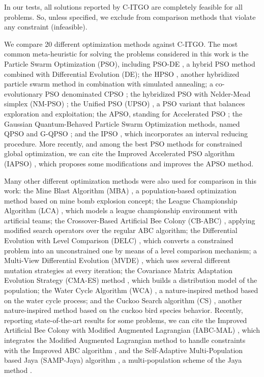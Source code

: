 


In our tests, all solutions reported by C-ITGO are completely feasible for all problems. So, unless specified, we exclude from comparison methods that violate any constraint (infeasible).

We compare 20 different optimization methods against C-ITGO. The most common meta-heuristic for solving the problems considered in this work is the Particle Swarm Optimization (PSO), including PSO-DE \citep{PSO-DE}, a hybrid PSO method combined with Differential Evolution (DE); the HPSO \citep{HPSO}, another hybridized particle swarm method in combination with simulated annealing; a co-evolutionary PSO denominated CPSO \citep{CPSO}; the hybridized PSO with Nelder-Mead simplex (NM-PSO) \citep{NM-PSO}; the Unified PSO (UPSO) \citep{UPSO}, a PSO variant that balances exploration and exploitation; the APSO, standing for Accelerated PSO  \citep{APSO}; the Gaussian Quantum-Behaved Particle Swarm Optimization methods, named QPSO and G-QPSO \citep{QPSO}; and the IPSO \citep{IPSO}, which incorporates an interval reducing procedure. More recently, and among the best PSO methods for constrained global optimization, we can cite the Improved Accelerated PSO algorithm (IAPSO) \citep{IAPSO}, which proposes some modifications and improves the APSO method.

Many other different optimization methods were also used for comparison in this work: the Mine Blast Algorithm (MBA) \citep{MBA}, a population-based optimization method based on mine bomb explosion concept; the League Championship Algorithm (LCA) \citep{LCA}, which models a league championship environment with artificial teams; the Crossover-Based Artificial Bee Colony (CB-ABC) \citep{CB-ABC}, applying modified search operators over the regular ABC algorithm; the Differential Evolution with Level Comparison (DELC) \citep{DELC}, which converts a constrained problem into an unconstrained one by means of a level comparison mechanism; a Multi-View Differential Evolution (MVDE) \citep{MVDE}, which uses several different mutation strategies at every iteration; the Covariance Matrix Adaptation Evolution Strategy (CMA-ES) method \citep{CMA-ES}, which builds a distribution model of the population; the Water Cycle Algorithm (WCA) \citep{WCA}, a nature-inspired method based on the water cycle process; and the Cuckoo Search algorithm (CS) \citep{CS}, another nature-inspired method based on the cuckoo bird species behavior. Recently, reporting state-of-the-art results for some problems, we can cite the Improved Artificial Bee Colony with Modified Augmented Lagrangian (IABC-MAL) \citep{IABC-Mal}, which integrates the Modified Augmented Lagrangian method to handle constraints with the Improved ABC algorithm \citep{IABC}, and the Self-Adaptive Multi-Population based Jaya (SAMP-Jaya) algorithm \citep{SAMP-Jaya}, a multi-population scheme of the Jaya method \citep{Jaya}.


